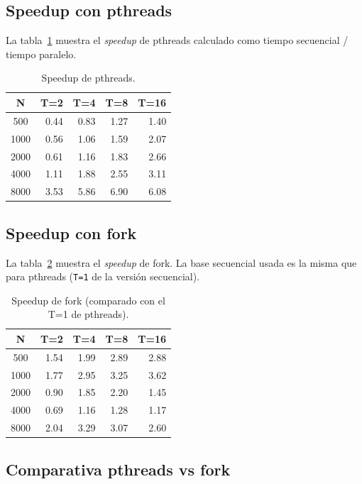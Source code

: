 \subsection{Speedup con pthreads}

La tabla~\ref{tab:speedup-pthreads} muestra el \textit{speedup} de pthreads calculado como tiempo secuencial / tiempo paralelo.

\begin{table}[ht]
\centering
\begin{tabular}{|c|r|r|r|r|}
\hline
\textbf{N} & \textbf{T=2} & \textbf{T=4} & \textbf{T=8} & \textbf{T=16} \\
\hline
500  & 0.44 & 0.83 & 1.27 & 1.40 \\
1000 & 0.56 & 1.06 & 1.59 & 2.07 \\
2000 & 0.61 & 1.16 & 1.83 & 2.66 \\
4000 & 1.11 & 1.88 & 2.55 & 3.11 \\
8000 & 3.53 & 5.86 & 6.90 & 6.08 \\
\hline
\end{tabular}
\caption{Speedup de pthreads.}
\label{tab:speedup-pthreads}
\end{table}

\subsection{Speedup con fork}

La tabla~\ref{tab:speedup-fork} muestra el \textit{speedup} de fork. La base secuencial usada es la misma que para pthreads (\texttt{T=1} de la versión secuencial).

\begin{table}[ht]
\centering
\begin{tabular}{|c|r|r|r|r|}
\hline
\textbf{N} & \textbf{T=2} & \textbf{T=4} & \textbf{T=8} & \textbf{T=16} \\
\hline
500  & 1.54 & 1.99 & 2.89 & 2.88 \\
1000 & 1.77 & 2.95 & 3.25 & 3.62 \\
2000 & 0.90 & 1.85 & 2.20 & 1.45 \\
4000 & 0.69 & 1.16 & 1.28 & 1.17 \\
8000 & 2.04 & 3.29 & 3.07 & 2.60 \\
\hline
\end{tabular}
\caption{Speedup de fork (comparado con el T=1 de pthreads).}
\label{tab:speedup-fork}
\end{table}

\subsection{Comparativa pthreads vs fork}

